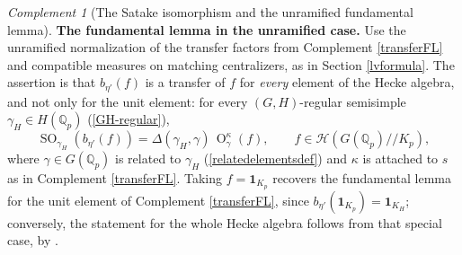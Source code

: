 \documentclass[11pt,a4paper]{article}
\theoremstyle{definition}
\theoremstyle{plain}
\theoremstyle{remark}
\newtheorem{Rc}[shared]{Complement}
\theoremstyle{plain}
\DeclareMathOperator{\Or}{O}
\DeclareMathOperator{\SO}{SO}
\begin{document}
\begin{Rc}[The Satake isomorphism and the unramified fundamental lemma]
    \textbf{The fundamental lemma in the unramified case.} Use the unramified normalization of the transfer factors from Complement \ref{transferFL} and compatible measures on matching centralizers, as in Section \ref{lvformula}. The assertion is that $b_{\eta'}(f)$ is a transfer of $f$ for \emph{every} element of the Hecke algebra, and not only for the unit element: for every $(G,H)$-regular semisimple $\gamma_H\in H(\mathbb{Q}_p)$ (\ref{GH-regular}),
    $$\SO_{\gamma_H}(b_{\eta'}(f))=\Delta(\gamma_H,\gamma)\,\Or^{\kappa}_{\gamma}(f), \qquad f\in\mathcal{H}(G(\mathbb{Q}_p)//K_p),$$
    where $\gamma\in G(\mathbb{Q}_p)$ is related to $\gamma_H$ (\ref{relatedelementsdef}) and $\kappa$ is attached to $s$ as in Complement \ref{transferFL}. Taking $f=\mathbf{1}_{K_p}$ recovers the fundamental lemma for the unit element of Complement \ref{transferFL}, since $b_{\eta'}(\mathbf{1}_{K_p})=\mathbf{1}_{K_H}$; conversely, the statement for the whole Hecke algebra follows from that special case, by \cite{MR1350645}.
\end{Rc}
\end{document}

